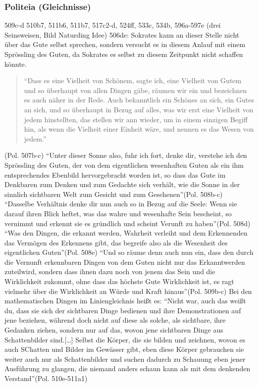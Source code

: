 \documentclass[12pt]{article}
\newcommand*{\zitatblock}[1]{%
    \begin{quote}
    \fontsize{10}{12}\selectfont
    \setlength{\parskip}{1.0em}
    #1
    \end{quote}
}
\begin{document}
\subsubsection{Politeia (Gleichnisse)}
509c-d 510b7, 511b6, 511b7, 517c2-d, 524ff, 533c, 534b, 596a-597e (drei Seinsweisen, Bild Naturding Idee)
506de: Sokrates kann an dieser Stelle nicht über das Gute selbst sprechen, sondern versucht es in diesem Anlauf mit einem Sprössling des Guten, da Sokrates es selbst zu diesem Zeitpunkt nicht schaffen könnte.
\zitatblock{\enquote{Dass es eine Vielheit von Schönem, sagte ich, eine Vielheit von Gutem und so überhaupt von allen Dingen gäbe, räumen wir ein und bezeichnen es auch näher in der Rede. Auch bekanntlich ein Schönes an sich, ein Gutes an sich, und so überhaupt in Bezug auf alles, was wir erst eine Vielheit von jedem hinstellten, das stellen wir ann wieder, um in einem einzigen Begiff hin, als wenn die Vielheit einer Einheit wäre, und nennen es das Wesen von jedem.}} (Pol. 507b-c)
\enquote{Unter dieser Sonne also, fuhr ich fort, denke dir, verstehe ich den Sprössling des Guten, der von dem eigentlichen wesenhaften Guten als ein ihm entsprechendes Ebenbild hervorgebracht worden ist, so dass das Gute im Denkbaren zum Denken und zum Gedachte sich verhält, wie die Sonne in der sinnlich sichtbaren Welt zum Gesicht und zum Gesehenen}(Pol. 508b-c)
\enquote{Dasselbe Verhältnis denke dir nun auch so in Bezug auf die Seele: Wenn sie darauf ihren Blick heftet, was das wahre und wesenhafte Sein bescheint, so vernimmt und erkennt sie es gründlich und scheint Verunft zu haben}(Pol. 508d)
\enquote{Was den Dingen, die erkannt werden, Wahrheit verleiht und dem Erkennenden das Vermögen des Erkennens gibt, das begreife also als die Wesenheit des eigentlichen Guten}(Pol. 508e)
\enquote{Und so räume denn auch nun ein, dass den durch die Vernunft erkennbaren Dingen von dem Guten nicht nur das Erkanntwerden zuteilwird, sondern dass ihnen dazu noch von jenem das Sein und die Wirklichkeit zukommt, ohne dass das höchste Gute Wirklichkeit ist, es ragt vielmehr über die Wirklichkeit an Würde und Kraft hinaus}(Pol. 509b-c)
Bei den mathematischen Dingen im Liniengleichnis heißt es: \enquote{Nicht war, auch das weißt du, dass sie sich der sichtbaren Dinge bedienen und ihre Demonstrationen auf jene beziehen, während doch nicht auf diese als solche, als sichtbare, ihre Gedanken ziehen, sondern nur auf das, wovon jene sichtbaren Dinge aus Schattenbilder sind.[\dots] Selbst die Körper, die sie bilden und zeichnen, wovon es auch SChatten und Bilder im Gewässer gibt, eben diese Körper gebrauchen sie weiter auch nur als Schattenbilder und suchen dadurch zu Schauung eben jener Ausführung zu glangen, die niemand anders schaun kann als mit dem denkenden Verstand}(Pol. 510e-511a1)
\end{document}
